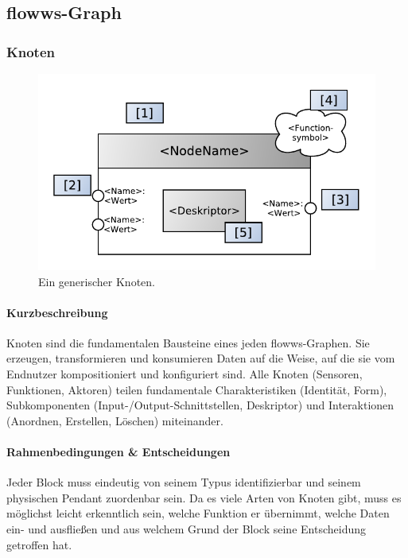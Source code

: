 
\subsection{flowws-Graph}
\subsubsection{Knoten}
\begin{figure}[h]
  \centering
  \includegraphics[width=.8\textwidth]{bilder/chapter4/chapter4_3/genericnode.pdf}
  \caption{Ein generischer Knoten.}
  \label{fig:genericnode}
\end{figure}

\paragraph{Kurzbeschreibung} Knoten sind die fundamentalen Bausteine eines jeden flowws-Graphen. Sie erzeugen, transformieren und konsumieren Daten auf die Weise, auf die sie vom Endnutzer kompositioniert und konfiguriert sind. Alle Knoten (Sensoren, Funktionen, Aktoren) teilen fundamentale Charakteristiken (Identität, Form), Subkomponenten (Input-/Output-Schnittstellen, Deskriptor) und Interaktionen (Anordnen, Erstellen, Löschen) miteinander. 

\paragraph{Rahmenbedingungen \& Entscheidungen} Jeder Block muss eindeutig von seinem Typus identifizierbar und seinem physischen Pendant zuordenbar sein. Da es viele Arten von Knoten gibt, muss es möglichst leicht erkenntlich sein, welche Funktion er übernimmt, welche Daten ein- und ausfließen und aus welchem Grund der Block seine Entscheidung getroffen hat.

